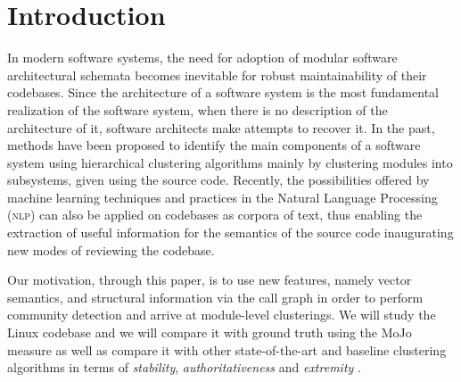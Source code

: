 \documentclass[sigconf, screen]{acmart}
\begin{document}
%



\maketitle

\section{Introduction}




In modern software systems, the need for adoption of modular software architectural schemata 
becomes inevitable for robust maintainability of their codebases.
Since the architecture of a software system is the most fundamental realization of the 
software system, when there is no description of the architecture of it, software 
architects make attempts to recover it. In the past, methods have been proposed to 
identify the main components of a software system using hierarchical clustering 
algorithms \cite{maqbool_overview, limbo} mainly by clustering modules into subsystems, given 
using the source code.    
Recently, the possibilities offered by machine learning techniques and practices in the Natural Language Processing (\textsc{nlp}) 
can also be applied on codebases as corpora of text, thus enabling 
the extraction of useful information for the semantics of the source code 
inaugurating new modes of reviewing the codebase. 

Our motivation, through this paper, is to use new features, namely vector semantics, and structural information via the call graph in order to perform community detection and arrive at module-level clusterings. 
We will study the Linux codebase and we will compare it with ground truth  using the MoJo measure \cite{mojo} as well as 
compare it with other state-of-the-art and baseline clustering algorithms  in terms of \emph{stability}, \emph{authoritativeness} and \emph{extremity}
\cite{maqbool_overview, evaluation}.
\end{document}
